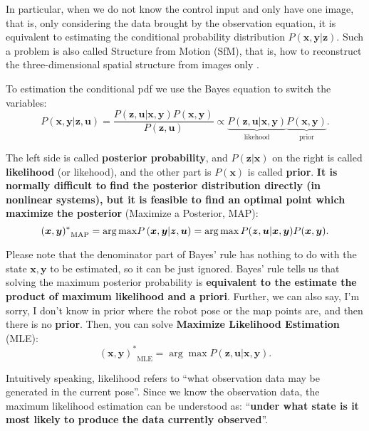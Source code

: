 In particular, when we do not know the control input and only have one image, that is, only considering the data brought by the observation equation, it is equivalent to estimating  the conditional probability distribution $ P (\bm {x}, \bm {y} | \bm { z}) $. Such a problem is also called Structure from Motion (SfM), that is, how to reconstruct the three-dimensional spatial structure from images only \textsuperscript {\cite {Agarwal2009}}.

To estimation the conditional pdf we use the Bayes equation to switch the variables:
\begin{equation}
P\left( { \bm{x},\bm{y}| \bm{z}, \bm{u}} \right) = \frac{{P\left( {\bm{z},\bm{u}|\bm{x},\bm{y}} \right)P\left( \bm{x}, \bm{y} \right)}}{{P\left( \bm{z},\bm{u}\right)}} \propto \underbrace{P\left(  { \bm{z},\bm{u}| \bm{x},\bm{y} } \right)}_{\text{likehood}} \underbrace{P\left( \bm{x},\bm{y} \right)}_{\text{prior}}.
\end{equation}

The left side is called \textbf {posterior probability}, and $ P (\bm {z} | \bm {x}) $ on the right is called \textbf {likelihood} (or likehood), and the other part is $ P (\bm {x}) $ is called \textbf {prior}. \textbf {It is normally difficult to find the posterior distribution directly (in nonlinear systems), but it is feasible to find an optimal point which maximize the posterior} (Maximize a Posterior, MAP):
\begin{equation}
{(\bm{x},\bm{y})^*}_{\mathrm{MAP}} = \arg {\mathop{\rm max}\nolimits} P \left( {\bm{x},\bm{y}|\bm{z},\bm{u}} \right) = \arg \max P(\bm{z},\bm{u}|\bm{x},\bm{y})P(\bm{x},\bm{y}).
\end{equation}

Please note that the denominator part of Bayes' rule has nothing to do with the state $ \bm {x}, \bm {y} $ to be estimated, so it can be just ignored. Bayes' rule tells us that solving the maximum posterior probability is \textbf {equivalent to the estimate the product of maximum likelihood and a priori}. Further, we can also say, I'm sorry, I don't know in prior where the robot pose or the map points are, and then there is no \textbf {prior}. Then, you can solve \textbf {Maximize Likelihood Estimation} (MLE):
\begin{equation}
{ (\bm{x},\bm{y})^*}_{\mathrm{MLE}} = \arg \max P( \bm{z},\bm{u}| \bm{x},\bm{y}).
\end{equation}

Intuitively speaking, likelihood refers to ``what observation data may be generated in the current pose''. Since we know the observation data, the maximum likelihood estimation can be understood as: ``\textbf{under what state is it most likely to produce the data currently observed}''. 


